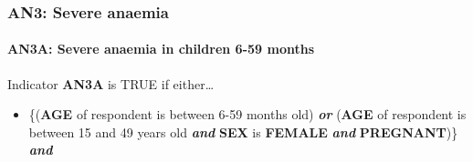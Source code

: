 \documentclass[12pt,a4paper]{article}
\let\oldparagraph\paragraph
\renewcommand{\paragraph}[1]{\oldparagraph{#1}\mbox{}}
\begin{document}
\newpage

\hypertarget{an3-severe-anaemia}{%
\subsubsection{AN3: Severe anaemia}\label{an3-severe-anaemia}}

\hypertarget{an3a-severe-anaemia-in-children-6-59-months}{%
\paragraph{AN3A: Severe anaemia in children 6-59 months}\label{an3a-severe-anaemia-in-children-6-59-months}}

Indicator \textbf{AN3A} is TRUE if either\ldots{}

\begin{itemize}
\item
  \{(\textbf{AGE} of respondent is between 6-59 months old) \textbf{\emph{or}} (\textbf{AGE} of respondent is between 15 and 49 years old \textbf{\emph{and}} \textbf{SEX} is \textbf{FEMALE} \textbf{\emph{and}} \textbf{PREGNANT})\} \textbf{\emph{and}}


\end{itemize}
\end{document}
